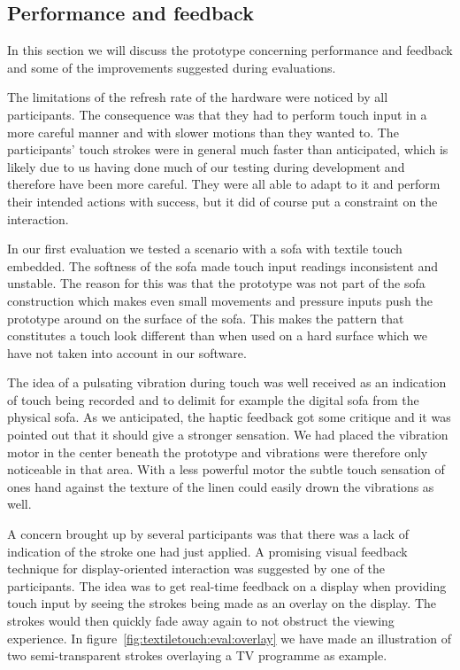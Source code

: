 \subsection{Performance and feedback}

In this section we will discuss the prototype concerning performance and feedback and some of the improvements suggested during evaluations.

The limitations of the refresh rate of the hardware were noticed by all participants.
The consequence was that they had to perform touch input in a more careful manner and with slower motions than they wanted to.
The participants' touch strokes were in general much faster than anticipated, which is likely due to us having done much of our testing during development and therefore have been more careful.
They were all able to adapt to it and perform their intended actions with success, but it did of course put a constraint on the interaction.

In our first evaluation we tested a scenario with a sofa with textile touch embedded.
The softness of the sofa made touch input readings inconsistent and unstable.
The reason for this was that the prototype was not part of the sofa construction which makes even small movements and pressure inputs push the prototype around on the surface of the sofa.
This makes the pattern that constitutes a touch look different than when used on a hard surface which we have not taken into account in our software.

The idea of a pulsating vibration during touch was well received as an indication of touch being recorded and to delimit for example the digital sofa from the physical sofa. 
As we anticipated, the haptic feedback got some critique and it was pointed out that it should give a stronger sensation.
We had placed the vibration motor in the center beneath the prototype and vibrations were therefore only noticeable in that area.
With a less powerful motor the subtle touch sensation of ones hand against the texture of the linen could easily drown the vibrations as well.

A concern brought up by several participants was that there was a lack of indication of the stroke one had just applied.
A promising visual feedback technique for display-oriented interaction was suggested by one of the participants.
The idea was to get real-time feedback on a display when providing touch input by seeing the strokes being made as an overlay on the display.
The strokes would then quickly fade away again to not obstruct the viewing experience. 
In figure~\ref{fig:textiletouch:eval:overlay} we have made an illustration of two semi-transparent strokes overlaying a TV programme as example. 

